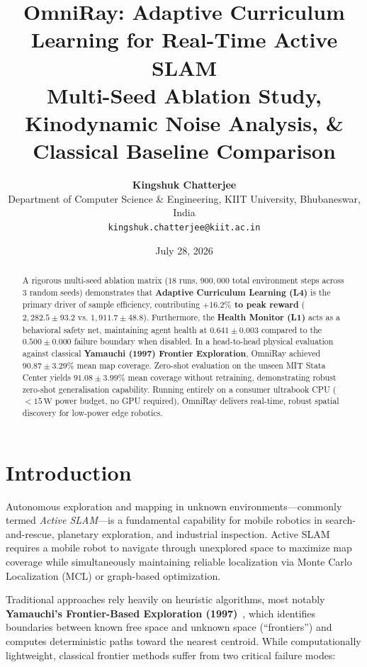 \documentclass[11pt,a4paper]{article}
\title{\textbf{OmniRay: Adaptive Curriculum Learning for Real-Time Active SLAM} \\
\Large Multi-Seed Ablation Study, Kinodynamic Noise Analysis, \& Classical Baseline Comparison}
\author{\textbf{Kingshuk Chatterjee} \\
Department of Computer Science \& Engineering, KIIT University, Bhubaneswar, India \\
\texttt{kingshuk.chatterjee@kiit.ac.in}}
\date{July 28, 2026}
\begin{document}
\maketitle

\begin{abstract}

A rigorous multi-seed ablation matrix ($18$ runs, $900,000$ total environment steps across 3 random seeds) demonstrates that \textbf{Adaptive Curriculum Learning (L4)} is the primary driver of sample efficiency, contributing \textbf{$+16.2\%$ to peak reward} ($2,282.5 \pm 93.2$ vs. $1,911.7 \pm 48.8$). Furthermore, the \textbf{Health Monitor (L1)} acts as a behavioral safety net, maintaining agent health at $0.641 \pm 0.003$ compared to the $0.500 \pm 0.000$ failure boundary when disabled. In a head-to-head physical evaluation against classical \textbf{Yamauchi (1997) Frontier Exploration}, OmniRay achieved $90.87 \pm 3.29\%$ mean map coverage. Zero-shot evaluation on the unseen MIT Stata Center yields $91.08 \pm 3.99\%$ mean coverage without retraining, demonstrating robust zero-shot generalisation capability. Running entirely on a consumer ultrabook CPU ($<15\,\text{W}$ power budget, no GPU required), OmniRay delivers real-time, robust spatial discovery for low-power edge robotics.

\end{abstract}

\section{Introduction}

Autonomous exploration and mapping in unknown environments—commonly termed \textit{Active SLAM}—is a fundamental capability for mobile robotics in search-and-rescue, planetary exploration, and industrial inspection. Active SLAM requires a mobile robot to navigate through unexplored space to maximize map coverage while simultaneously maintaining reliable localization via Monte Carlo Localization (MCL) or graph-based optimization.

Traditional approaches rely heavily on heuristic algorithms, most notably \textbf{Yamauchi's Frontier-Based Exploration (1997)}~\cite{yamauchi1997}, which identifies boundaries between known free space and unknown space (``frontiers'') and computes deterministic paths toward the nearest centroid. While computationally lightweight, classical frontier methods suffer from two critical failure modes:
\end{document}

